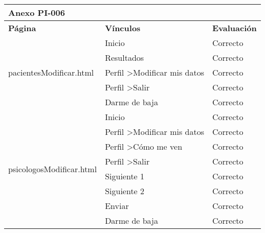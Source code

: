 \begin{table}[htpb]
\centering
\begin{tabularx}{\textwidth}{|l|X|l|}
\hline
\multicolumn{3}{|l|}{\textbf{Anexo PI-006}}                                                                            \\ \hline
\textbf{Página}                           & \textbf{Vínculos}                                   & \textbf{Evaluación} \\ \hline
\multirow{5}{*}{pacientesModificar.html}  & Inicio                                              & Correcto            \\ \cline{2-3} 
                                          & Resultados                                          & Correcto            \\ \cline{2-3} 
                                          & Perfil \textgreater Modificar mis datos             & Correcto            \\ \cline{2-3} 
                                          & Perfil \textgreater Salir                           & Correcto            \\ \cline{2-3} 
                                          & Darme de baja                                       & Correcto            \\ \hline
\multirow{8}{*}{psicologosModificar.html} & Inicio                                              & Correcto            \\ \cline{2-3} 
                                          & Perfil \textgreater Modificar mis datos             & Correcto            \\ \cline{2-3} 
                                          & Perfil \textgreater Cómo me ven                     & Correcto            \\ \cline{2-3} 
                                          & Perfil \textgreater Salir                           & Correcto            \\ \cline{2-3} 
                                          & Siguiente 1                                         & Correcto            \\ \cline{2-3} 
                                          & Siguiente 2                                         & Correcto            \\ \cline{2-3} 
                                          & Enviar                                              & Correcto            \\ \cline{2-3} 
                                          & Darme de baja                                       & Correcto            \\ \hline

\end{tabularx}
\end{table}
